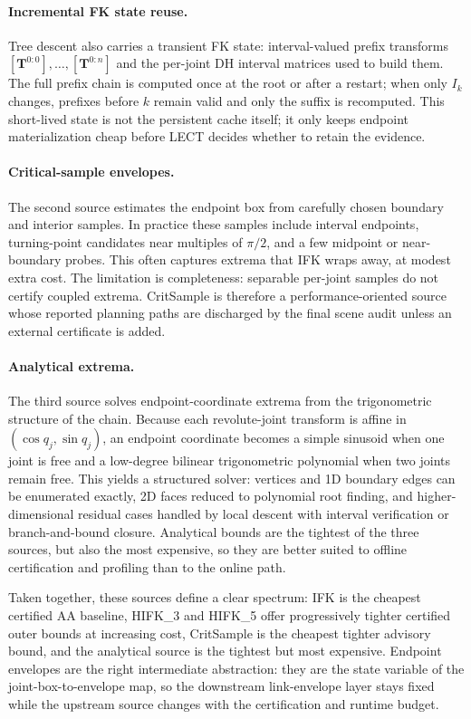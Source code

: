 \documentclass[journal]{IEEEtran}
\begin{document}
\paragraph{Incremental FK state reuse.}
Tree descent also carries a transient FK state: interval-valued prefix
transforms $[\bm{T}^{0:0}],\ldots,[\bm{T}^{0:n}]$ and the per-joint DH
interval matrices used to build them. The full prefix chain is computed once at
the root or after a restart; when only $I_k$ changes, prefixes before $k$
remain valid and only the suffix is recomputed. This short-lived state is not
the persistent cache itself; it only keeps endpoint materialization cheap
before LECT decides whether to retain the evidence.

\paragraph{Critical-sample envelopes.}
The second source estimates the endpoint box from carefully chosen boundary and
interior samples. In practice these samples include interval endpoints,
turning-point candidates near multiples of $\pi/2$, and a few midpoint or
near-boundary probes. This often captures extrema that IFK wraps away, at
modest extra cost. The limitation is completeness: separable per-joint samples
do not certify coupled extrema. CritSample is therefore a performance-oriented
source whose reported planning paths are discharged by the final scene audit
unless an external certificate is added.

\paragraph{Analytical extrema.}
The third source solves endpoint-coordinate extrema from the trigonometric
structure of the chain. Because each revolute-joint transform is affine in
$(\cos q_j,\sin q_j)$, an endpoint coordinate becomes a simple sinusoid when
one joint is free and a low-degree bilinear trigonometric polynomial when two
joints remain free. This yields a structured solver: vertices and 1D boundary
edges can be enumerated exactly, 2D faces reduced to polynomial root finding,
and higher-dimensional residual cases handled by local descent with interval
verification or branch-and-bound closure. Analytical bounds are the tightest of
the three sources, but also the most expensive, so they are better suited to
offline certification and profiling than to the online path.

Taken together, these sources define a clear spectrum: IFK is the cheapest
certified AA baseline, HIFK\_3 and HIFK\_5 offer progressively tighter
certified outer bounds at increasing cost, CritSample is the cheapest tighter
advisory bound, and the analytical source is the tightest but most expensive.
Endpoint
envelopes are the right intermediate abstraction: they are the state variable of
the joint-box-to-envelope map, so the downstream link-envelope layer stays
fixed while the upstream source changes with the certification and runtime
budget.
\end{document}
